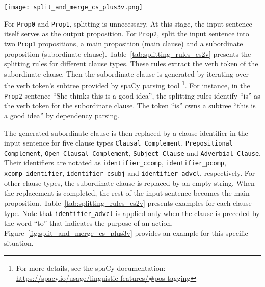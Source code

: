 \begin{figure*}[h!]
  \texttt{[image: split\_and\_merge\_cs\_plus3v.png]}
  \caption{Splitting a \texttt{Prop3+} sentence and merging its proposition representations by backtracking. At each splitting step, the method for splitting \texttt{Prop2} is called. The extracted proposition invokes the representation component to build a hierarchical network. During the upward traversal, the same strategies for merging \texttt{P2}---denoted by green, grey, and purple arrows---are employed to integrate all networks into a unified network. Note that \texttt{identifier\_advcl} is a placeholder for an adverbial clause.}
  \label{fig:split_and_merge_cs_plus3v}
\end{figure*}


For \texttt{Prop0} and \texttt{Prop1}, splitting is unnecessary. At this stage, the input sentence itself serves as the output proposition. For \texttt{Prop2}, split the input sentence into two \texttt{Prop1} propositions, a main proposition (main clause) and a subordinate proposition (subordinate clause). Table~\ref{tab:splitting_rules_cs2v} presents the splitting rules for different clause types. These rules extract the verb token of the subordinate clause. Then the subordinate clause is generated by iterating over the verb token's subtree provided by spaCy parsing tool \footnote{For more details, see the spaCy documentation: \url{https://spacy.io/usage/linguistic-features/\#pos-tagging}}. For instance, in the \texttt{Prop2} sentence ``She thinks this is a good idea'', the splitting rules identify ``is'' as the verb token for the subordinate clause. The token ``is'' owns a subtree ``this is a good idea'' by dependency parsing. 


The generated subordinate clause is then replaced by a clause identifier in the input sentence for five clause types \texttt{Clausal Complement}, \texttt{Prepositional Complement}, \texttt{Open Clausal Complement}, \texttt{Subject Clause} and \texttt{Adverbial Clause}. Their identifiers are notated as \texttt{identifier\_ccomp}, \texttt{identifier\_pcomp}, \texttt{xcomp\_identifier}, \texttt{identifier\_csubj} and \texttt{identifier\_advcl}, respectively. For other clause types, the subordinate clause is replaced by an empty string. When the replacement is completed, the rest of the input sentence becomes the main proposition. Table~\ref{tab:splitting_rules_cs2v} presents examples for each clause type. Note that \texttt{identifier\_advcl} is applied only when the clause is preceded by the word ``to'' that indicates the purpose of an action. Figure~\ref{fig:split_and_merge_cs_plus3v} provides an example for this specific situation. 

